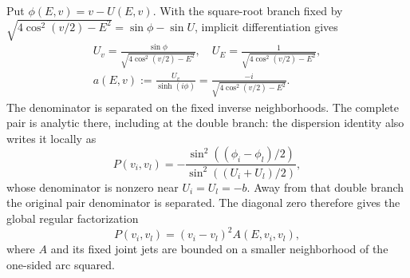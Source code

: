 \documentclass[11pt]{article}
\numberwithin{equation}{section}
\theoremstyle{definition}
\begin{document}
Put $\phi({E},v)=v-U({E},v)$.  With the square-root
branch fixed by $\sqrt{4\cos^2(v/2)-{E}^2}=\sin\phi-\sin U$,
implicit differentiation gives
\begin{equation}\label{eq:iso-regular-factors}\begin{gathered}
 U_v=\frac{\sin\phi}{\sqrt{4\cos^2(v/2)-{E}^2}},\quad
 U_{{E}}=\frac1{\sqrt{4\cos^2(v/2)-{E}^2}},\\
 a({E},v):=\frac{U_v}{\sinh(i\phi)}
     =\frac{-i}{\sqrt{4\cos^2(v/2)-{E}^2}}.
\end{gathered}\end{equation}
The denominator is separated on the fixed inverse neighborhoods.
The complete pair is analytic there, including at the double branch:
the dispersion identity also writes it locally as
\[
 P(v_i,v_l)=-\frac{\sin^2((\phi_i-\phi_l)/2)}
                         {\sin^2((U_i+U_l)/2)},
\]
whose denominator is nonzero near $U_i=U_l=-b$.
Away from that double branch the original pair denominator is
separated.  The diagonal zero therefore gives the global regular
factorization
\begin{equation}\label{eq:iso-pair-zero}
 P(v_i,v_l)=(v_i-v_l)^2 A({E},v_i,v_l),
\end{equation}
where $A$ and its fixed joint jets are bounded on a smaller
neighborhood of the one-sided arc squared.
\end{document}
